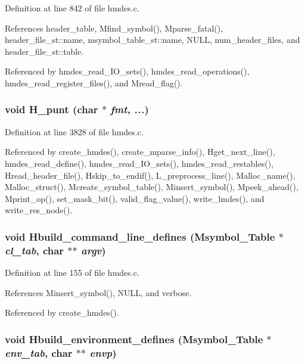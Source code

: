 Definition at line 842 of file hmdes.c.

References header\_\-table, Mfind\_\-symbol(), Mparse\_\-fatal(), header\_\-file\_\-st::name, msymbol\_\-table\_\-st::name, NULL, num\_\-header\_\-files, and header\_\-file\_\-st::table.

Referenced by hmdes\_\-read\_\-IO\_\-sets(), hmdes\_\-read\_\-operations(), hmdes\_\-read\_\-register\_\-files(), and Mread\_\-flag().
\subsubsection{\setlength{\rightskip}{0pt plus 5cm}void H\_\-punt (char $\ast$ {\em fmt},  {\em ...})}\label{hmdes_8c_4b5d684504778c8d474321a099a3c4b2}




Definition at line 3828 of file hmdes.c.

Referenced by create\_\-hmdes(), create\_\-mparse\_\-info(), Hget\_\-next\_\-line(), hmdes\_\-read\_\-define(), hmdes\_\-read\_\-IO\_\-sets(), hmdes\_\-read\_\-restables(), Hread\_\-header\_\-file(), Hskip\_\-to\_\-endif(), L\_\-preprocess\_\-line(), Malloc\_\-name(), Malloc\_\-struct(), Mcreate\_\-symbol\_\-table(), Minsert\_\-symbol(), Mpeek\_\-ahead(), Mprint\_\-op(), set\_\-mask\_\-bit(), valid\_\-flag\_\-value(), write\_\-lmdes(), and write\_\-res\_\-node().
\subsubsection{\setlength{\rightskip}{0pt plus 5cm}void Hbuild\_\-command\_\-line\_\-defines (\bf{Msymbol\_\-Table} $\ast$ {\em cl\_\-tab}, char $\ast$$\ast$ {\em argv})}\label{hmdes_8c_a80c53a0b9e7a49dbeaed5b087e74ff6}




Definition at line 155 of file hmdes.c.

References Minsert\_\-symbol(), NULL, and verbose.

Referenced by create\_\-hmdes().
\subsubsection{\setlength{\rightskip}{0pt plus 5cm}void Hbuild\_\-environment\_\-defines (\bf{Msymbol\_\-Table} $\ast$ {\em env\_\-tab}, char $\ast$$\ast$ {\em envp})}\label{hmdes_8c_ff072a5397cbb97e07781e19a7a213e5}




